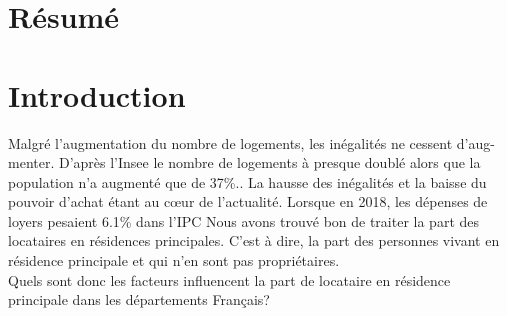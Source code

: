 \documentclass{article}
\begin{document}
\tableofcontents
\section{Résumé}
\section{Introduction} 
Malgré l'augmentation du nombre de logements, les inégalités ne cessent d'aug-menter. D'après l'Insee le nombre de logements à presque doublé alors que la population n'a augmenté que 
de 37\%.\cite{evolution_hab}. La hausse des inégalités et la baisse du pouvoir d'achat étant au cœur de l'actualité. Lorsque en 2018, les dépenses de loyers pesaient 6.1\% dans l'IPC\cite{ipc_loyer} Nous avons trouvé bon de traiter la part des locataires en résidences principales. C'est à dire, la part des personnes vivant en résidence principale et qui n'en sont pas propriétaires. \\
Quels sont donc les facteurs influencent la part de locataire en résidence principale dans les départements Français? 
\end{document}

